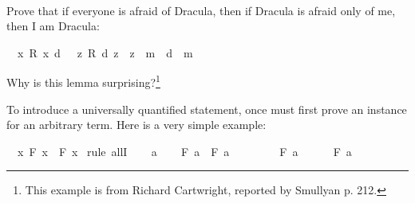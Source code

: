 \begin{isabellebody}
\isadelimproof
\ %
\endisadelimproof
%
\isatagproof
{}\isamarkupfalse%
%
\endisatagproof
{\isafoldproof}%
%
\isadelimproof
%
\endisadelimproof
%
\begin{isamarkuptext}%
\begin{Exercise}[title = The Riddle of Dracula, label = dracula]
Prove that if everyone is afraid of Dracula, then if Dracula is afraid only of me, then I am Dracula: \end{Exercise}%
\end{isamarkuptext}\isamarkuptrue%
\isamarkupfalse%
\ {\isachardoublequoteopen}{\isacharparenleft}{\isasymforall}\ x{\isachardot}\ R\ x\ d{\isacharparenright}\ {\isasymlongrightarrow}\ {\isacharparenleft}{\isasymforall}\ z{\isachardot}\ R\ d\ z\ {\isasymlongrightarrow}\ z\ {\isacharequal}\ m{\isacharparenright}\ {\isasymlongrightarrow}\ d\ {\isacharequal}\ m{\isachardoublequoteclose}%
\isadelimproof
\ %
\endisadelimproof
%
\isatagproof
{}\isamarkupfalse%
%
\endisatagproof
{\isafoldproof}%
%
\isadelimproof
%
\endisadelimproof
%
\begin{isamarkuptext}%
Why is this lemma surprising?\footnote{This example is from Richard Cartwright, reported by
Smullyan \cite{smullyan_what_1978} p. 212.}%
\end{isamarkuptext}\isamarkuptrue%
%
\isamarkuptrue%
%
\begin{isamarkuptext}%
To introduce a universally quantified statement, once must first prove an instance for an
arbitrary term. Here is a very simple example:%
\end{isamarkuptext}\isamarkuptrue%
\isamarkupfalse%
\ {\isachardoublequoteopen}{\isasymforall}\ x{\isachardot}\ F\ x\ {\isasymlongrightarrow}\ F\ x{\isachardoublequoteclose}\isanewline
%
\isadelimproof
%
\endisadelimproof
%
\isatagproof
{}\isamarkupfalse%
\ {\isacharparenleft}rule\ allI{\isacharparenright}\isanewline
\ \ \isamarkupfalse%
\ a\isanewline
\ \ \isamarkupfalse%
\ {\isachardoublequoteopen}F\ a\ {\isasymlongrightarrow}\ F\ a{\isachardoublequoteclose}\isanewline
\ \ \isamarkupfalse%
\isanewline
\ \ \ \ \isamarkupfalse%
\ {\isachardoublequoteopen}F\ a{\isachardoublequoteclose}\isanewline
\ \ \ \ \isamarkupfalse%
\ {\isachardoublequoteopen}F\ a{\isachardoublequoteclose}\isacommand{{\isachardot}}\isamarkupfalse%
\isanewline
\ \ \isamarkupfalse%
\isanewline
{}\isamarkupfalse%

\end{isabellebody}
